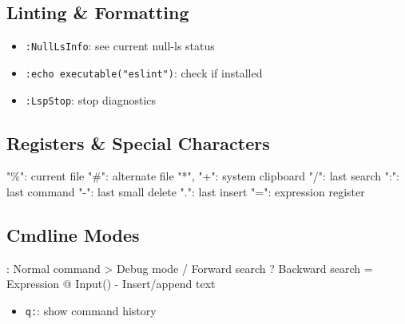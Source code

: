 \documentclass[
  letterpaper,
  DIV=11,
  numbers=noendperiod]{scrartcl}
\newenvironment{Shaded}{}{}
\newcommand{\NormalTok}[1]{\textcolor[rgb]{0.22,0.23,0.26}{#1}}
\providecommand{\tightlist}{%
  \setlength{\itemsep}{0pt}\setlength{\parskip}{0pt}}\usepackage{longtable,booktabs,array}
\begin{document}
\subsection{Linting \& Formatting}\label{linting-formatting}

\begin{itemize}
\tightlist
\item
  \texttt{:NullLsInfo}: see current null-ls status
\item
  \texttt{:echo\ executable("eslint")}: check if installed
\item
  \texttt{:LspStop}: stop diagnostics
\end{itemize}

\subsection{Registers \& Special
Characters}\label{registers-special-characters}

\begin{Shaded}
\begin{Highlighting}[]
\NormalTok{"\%": current file}
\NormalTok{"\#": alternate file}
\NormalTok{"*", "+": system clipboard}
\NormalTok{"/": last search}
\NormalTok{":": last command}
\NormalTok{"{-}": last small delete}
\NormalTok{".": last insert}
\NormalTok{"=": expression register}
\end{Highlighting}
\end{Shaded}

\subsection{Cmdline Modes}\label{cmdline-modes}

\begin{Shaded}
\begin{Highlighting}[]
\NormalTok{:   Normal command}
\NormalTok{\textgreater{}   Debug mode}
\NormalTok{/   Forward search}
\NormalTok{?   Backward search}
\NormalTok{=   Expression}
\NormalTok{@   Input()}
\NormalTok{{-}   Insert/append text}
\end{Highlighting}
\end{Shaded}

\begin{itemize}
\tightlist
\item
  \texttt{q:}: show command history
\end{itemize}
\end{document}
